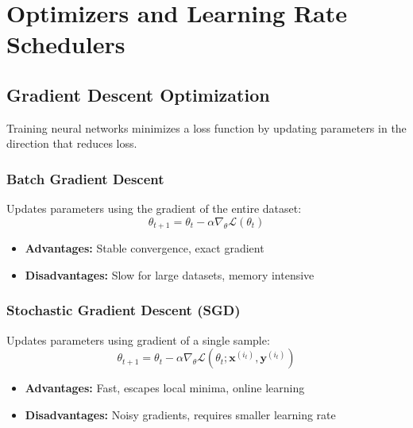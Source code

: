 %

\clearpage
\cleardoublepage

\chapter{Optimizers and Learning Rate Schedulers}

\section{Gradient Descent Optimization}

Training neural networks minimizes a loss function by updating parameters in the direction that reduces loss.

\subsection{Batch Gradient Descent}

Updates parameters using the gradient of the entire dataset:
\begin{equation}
\theta_{t+1} = \theta_t - \alpha \nabla_\theta \mathcal{L}(\theta_t)
\end{equation}

\begin{itemize}
    \item \textbf{Advantages:} Stable convergence, exact gradient
    \item \textbf{Disadvantages:} Slow for large datasets, memory intensive
\end{itemize}

\subsection{Stochastic Gradient Descent (SGD)}

Updates parameters using gradient of a single sample:
\begin{equation}
\theta_{t+1} = \theta_t - \alpha \nabla_\theta \mathcal{L}(\theta_t; \mathbf{x}^{(i_t)}, \mathbf{y}^{(i_t)})
\end{equation}

\begin{itemize}
    \item \textbf{Advantages:} Fast, escapes local minima, online learning
    \item \textbf{Disadvantages:} Noisy gradients, requires smaller learning rate
\end{itemize}


